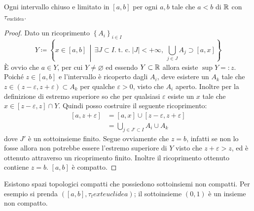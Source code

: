 \begin{theorem}
	Ogni intervallo chiuso e limitato in $\left[a, b\right]$ per ogni $a, b$ tale che $a < b$ di $\mathbb{R}$ con $\tau_{\text{euclidea}}$.
\end{theorem} 
\begin{proof}
	Dato un ricoprimento $\left\{A_i\right\}_{i \in I}$ 
	\begin{equation*}
			Y \coloneqq \left\{ x\in \left[a,b\right] \,\middle|\, \exists J \subset I. \; \text{t. c.} \; |J| < +\infty,\ \bigcup_{j \in J} A_j \supset \left[a,x\right] \right\}
	\end{equation*}
	È ovvio che $a \in Y$, per cui $Y \neq \varnothing$ ed essendo $Y \subset \mathbb{R}$ allora esiste $\sup Y =: z$. \\ Poiché $z \in \left[a,b\right]$ e l'intervallo è ricoperto dagli $A_i$, deve esistere un $A_{k}$ tale che $z \in (z-\varepsilon, z+\varepsilon) \subset A_k$ per qualche $\varepsilon > 0$, visto che $A_i$ aperto. Inoltre per la definizione di estremo superiore so che per qualsiasi $\varepsilon$ esiste un $x$ tale che $x \in \left[z-\varepsilon, z\right] \cap Y$. Quindi posso costruire il seguente ricoprimento:
	\begin{align*}
		\left[a,z+\varepsilon\right] & = \left[a,x\right] \cup \left[z-\varepsilon, z+\varepsilon\right]\\
				& =  \bigcup_{j \in J' \subset I} A_i \cup A_k
	\end{align*}
	dove $J'$ è un sottoinsieme finito. Segue ovviamente che $z = b$, infatti se non lo fosse allora non potrebbe essere l'estremo superiore di $Y$ visto che $z+\varepsilon > z$, ed è ottenuto attraverso un ricoprimento finito. Inoltre il ricoprimento ottenuto contiene $z = b$. $\left[a,b\right]$ è compatto.
\end{proof}

\begin{remark}
	Esistono spazi topologici compatti che possiedono sottoinsiemi non compatti. Per esempio si prenda $(\left[a, b\right],\tau_text{euclidea})$; il sottoinsieme $(0, 1)$ è un insieme non compatto. 
\end{remark} 

